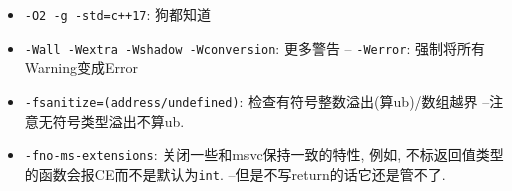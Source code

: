 \begin{itemize}
	\item \texttt{-O2 -g -std=c++17}: 狗都知道
	\item \texttt{-Wall -Wextra -Wshadow -Wconversion}: 更多警告
		\subitem --\; \texttt{-Werror}: 强制将所有Warning变成Error
	\item \texttt{-fsanitize=(address/undefined)}: 检查有符号整数溢出(算ub)/数组越界
		\subitem --\;注意无符号类型溢出不算ub.
	\item \texttt{-fno-ms-extensions}: 关闭一些和msvc保持一致的特性, 例如, 不标返回值类型的函数会报CE而不是默认为\texttt{int}.
		\subitem --\;但是不写return的话它还是管不了.
\end{itemize}